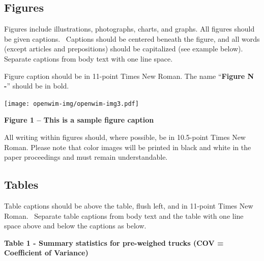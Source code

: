 \documentclass[a4paper]{article}
\begin{document}
{\subsection{Figures}
{
Figures include illustrations, photographs, charts, and graphs. All
figures should be given captions. \ Captions should be centered beneath
the figure, and all words (except articles and prepositions) should be
capitalized (see example below). Separate captions from body text with
one line space. }


\bigskip

{
Figure caption should be in 11-point Times New Roman. The name
“\textbf{Figure N -}” should be in bold.}


\bigskip

{\centering 
\texttt{[image: openwim-img/openwim-img3.pdf]}
\par}

{\centering{}\bfseries
Figure 1 – This is a sample figure caption
\par}


\bigskip

{
All writing within figures should, where possible, be in 10.5-point
Times New Roman. Please note that color images will be printed in black
and white in the paper proceedings and must remain understandable. }

\subsection{Tables}
{
Table captions should be above the table, flush left, and in 11-point
Times New Roman. \ Separate table captions from body text and the table
with one line space above and below the captions as below. \ }


\bigskip

{\bfseries
Table 1 - Summary statistics for pre-weighed trucks (COV = Coefficient
of Variance)}


\bigskip

}
\end{document}

